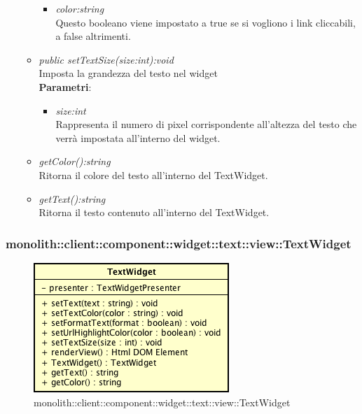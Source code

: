 \begin{itemize}
\begin{itemize}
\begin{itemize}
		\item \textit{color:string}\\
		Questo booleano viene impostato a true se si vogliono i link cliccabili, a false altrimenti.
		\end{itemize} 
	\item \textit{public setTextSize(size:int):void}\\
	Imposta la grandezza del testo nel widget
		\\ \textbf{Parametri}: \begin{itemize}
		\item \textit{size:int}\\
		Rappresenta il numero di pixel corrispondente all'altezza del testo che verrà impostata all'interno del widget.
		\end{itemize} 
	\item \textit{getColor():string}\\
	Ritorna il colore del testo all'interno del TextWidget.
	\item \textit{getText():string}\\
	Ritorna il testo contenuto all'interno del TextWidget.
	\end{itemize}
\end{itemize}

\subsubsection{monolith::client::component::widget::text::view::TextWidget}

\label{monolith::client::component::widget::text::view::TextWidget}
\begin{figure}[H]
	\centering
	\includegraphics[scale=0.5]{Sezioni/SottosezioniST/img/TextWidget.png}
	\caption{monolith::client::component::widget::text::view::TextWidget}
\end{figure}

